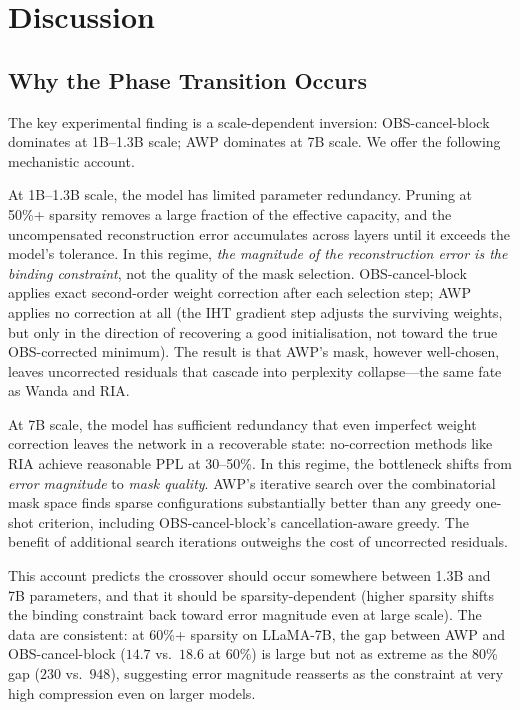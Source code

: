 \documentclass{article}
\begin{document}
\section{Discussion}
\label{sec:discussion}

\subsection{Why the Phase Transition Occurs}

The key experimental finding is a scale-dependent inversion: OBS-cancel-block
dominates at 1B--1.3B scale; AWP dominates at 7B scale. We offer the following
mechanistic account.

At 1B--1.3B scale, the model has limited parameter redundancy. Pruning at
50\%+ sparsity removes a large fraction of the effective capacity, and the
uncompensated reconstruction error accumulates across layers until it exceeds
the model's tolerance. In this regime, \emph{the magnitude of the reconstruction
error is the binding constraint}, not the quality of the mask selection.
OBS-cancel-block applies exact second-order weight correction after each
selection step; AWP applies no correction at all (the IHT gradient step adjusts
the surviving weights, but only in the direction of recovering a good initialisation,
not toward the true OBS-corrected minimum). The result is that AWP's mask,
however well-chosen, leaves uncorrected residuals that cascade into perplexity
collapse---the same fate as Wanda and RIA.

At 7B scale, the model has sufficient redundancy that even imperfect weight
correction leaves the network in a recoverable state: no-correction methods like
RIA achieve reasonable PPL at 30--50\%. In this regime, the bottleneck shifts
from \emph{error magnitude} to \emph{mask quality}. AWP's iterative search over
the combinatorial mask space finds sparse configurations substantially better
than any greedy one-shot criterion, including OBS-cancel-block's
cancellation-aware greedy. The benefit of additional search iterations outweighs
the cost of uncorrected residuals.

This account predicts the crossover should occur somewhere between 1.3B and 7B
parameters, and that it should be sparsity-dependent (higher sparsity shifts the
binding constraint back toward error magnitude even at large scale). The data
are consistent: at 60\%+ sparsity on LLaMA-7B, the gap between AWP and
OBS-cancel-block ($14.7$ vs.\ $18.6$ at 60\%) is large but not as extreme
as the 80\% gap ($230$ vs.\ $948$), suggesting error magnitude reasserts as
the constraint at very high compression even on larger models.
\end{document}
